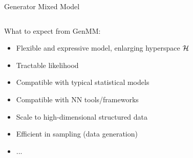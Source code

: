 \begin{frame}[label=current]{Generator Mixed Model}
\begin{columns}
\begin{minipage}{\linewidth}
    \end{minipage}
  \end{columns}
  
  \vskip -0.5cm
  What to expect from GenMM:
  \begin{itemize}[label=\textbullet]
  \item {Flexible and expressive model, enlarging hyperspace $\mathcal{H}$}
  \item {Tractable likelihood} 
  \item {Compatible with typical statistical models}
  \item Compatible with NN tools/frameworks
  \item {Scale to high-dimensional structured data}
  \item {Efficient in sampling (data generation)}
  \item {...}
  \end{itemize}

\end{frame}




